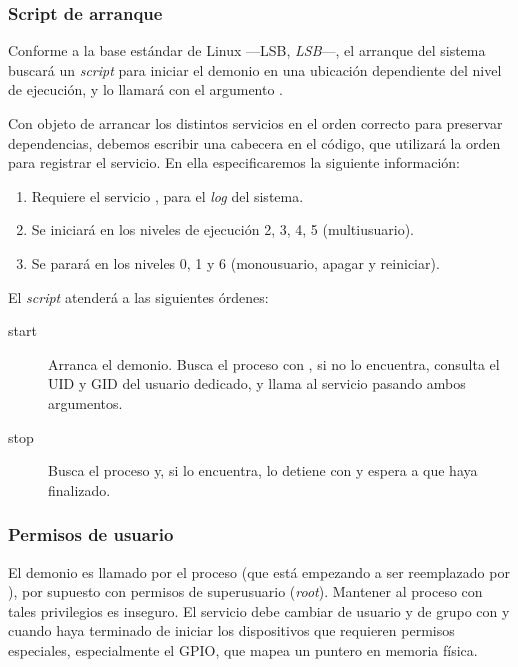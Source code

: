 \subsubsection{Script de arranque}

Conforme a la base estándar de Linux ---\acrshort{LSB}, \textit{\acrlong{LSB}}---, el arranque del sistema buscará un \textit{script} para iniciar el demonio en una ubicación dependiente del nivel de ejecución, y lo llamará con el argumento . \cite{debian_lsbinit}

Con objeto de arrancar los distintos servicios en el orden correcto para preservar dependencias, debemos escribir una cabecera en el código, que utilizará la orden  para registrar el servicio. En ella especificaremos la siguiente información:

\begin{enumerate}
	\item Requiere el servicio , para el \textit{log} del sistema.
	\item Se iniciará en los niveles de ejecución 2, 3, 4, 5 (multiusuario). \cite{wiki_runlevel}
	\item Se parará en los niveles 0, 1 y 6 (monousuario, apagar y reiniciar).
\end{enumerate}

El \textit{script} atenderá a las siguientes órdenes:

\begin{description}
	\item[start] Arranca el demonio. Busca el proceso con , si no lo encuentra, consulta el \acrshort{UID} y \acrshort{GID} del usuario dedicado, y llama al servicio pasando ambos argumentos.
	
	\item[stop] Busca el proceso y, si lo encuentra, lo detiene con  y espera a que haya finalizado.
\end{description}

\subsubsection{Permisos de usuario}

El demonio es llamado por el proceso  (que está empezando a ser reemplazado por ), por supuesto con permisos de superusuario (\textit{root}). Mantener al proceso con tales privilegios es inseguro. El servicio debe cambiar de usuario y de grupo con  y  cuando haya terminado de iniciar los dispositivos que requieren permisos especiales, especialmente el \acrshort{GPIO}, que mapea un puntero en memoria física.

